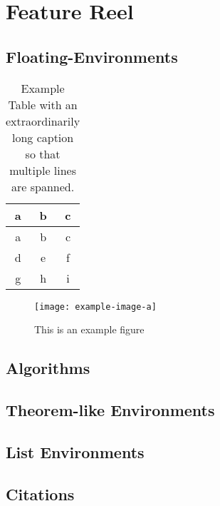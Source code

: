 \chapter{Feature Reel} 

\section{Floating-Environments} 

\begin{table}[ht]
	\centering
	\begin{tabular}{ccc}
		\toprule
		a & b & c \\
		\midrule
		a & b & c \\
		d & e & f \\
		g & h & i \\
		\bottomrule
	\end{tabular}
	\caption{Example Table with an extraordinarily long caption so that multiple lines are spanned. } 
	\label{tab:example-table} 
\end{table}

\begin{figure}[ht]
	\centering 
	\texttt{[image: example-image-a]}
	\caption{This is an example figure} 
	\label{fig:example-fig} 
\end{figure}

\section{Algorithms} 
% 

\section{Theorem-like Environments} 

\section{List Environments} 

\section{Citations}

